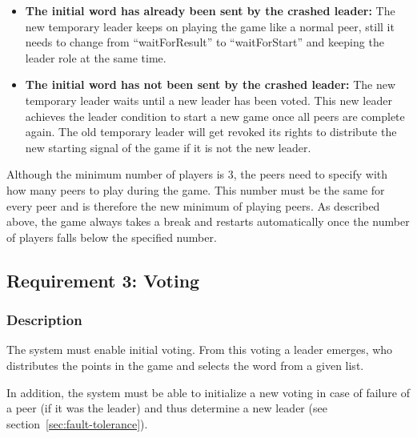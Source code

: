 \documentclass[runningheads]{llncs}
\begin{document}
\begin{itemize}
                \begin{itemize}
                    \item \textbf{The initial word has already been sent by the crashed leader: } The new temporary leader keeps on playing the game like a normal peer, still it needs to change from \enquote{waitForResult} to \enquote{waitForStart} and keeping the leader role at the same time.
                    \item \textbf{The initial word has not been sent by the crashed leader:} The new temporary leader waits until a new leader has been voted. This new leader achieves the leader condition to start a new game once all peers are complete again. The old temporary leader will get revoked its rights to distribute the new starting signal of the game if it is not the new leader.
                \end{itemize}
            \end{itemize}
            
            Although the minimum number of players is 3, the peers need to specify with how many peers to play during the game. This number must be the same for every peer and is therefore the new minimum of playing peers. As described above, the game always takes a break and restarts automatically once the number of players falls below the specified number.
            
    \subsection{Requirement 3: Voting} \label{sec:voting}
        \subsubsection{Description}
            The system must enable initial voting. From this voting a leader emerges, who distributes the points in the game and selects the word from a given list.
            
            In addition, the system must be able to initialize a new voting in case of failure of a peer (if it was the leader) and thus determine a new leader (see section~\ref{sec:fault-tolerance}).
            
\end{document}

